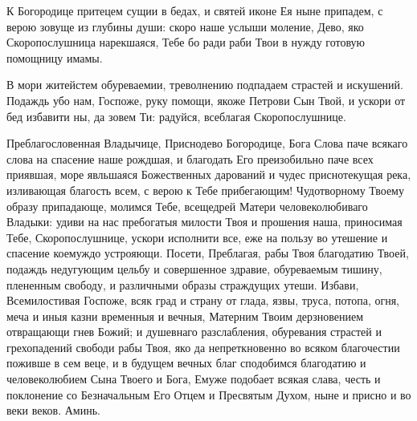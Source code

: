 \begin{mymulticols}


К Богородице притецем сущии в бедах, и святей иконе Ея ныне припадем, с верою зовуще из глубины души: скоро наше услыши моление, Дево, яко Скоропослушница нарекшаяся, Тебе бо ради раби Твои в нужду готовую помощницу имамы.


В мори житейстем обуреваемии, треволнению подпадаем страстей и искушений. Подаждь убо нам, Госпоже, руку помощи, якоже Петрови Сын Твой, и ускори от бед избавити ны, да зовем Ти: радуйся, всеблагая Скоропослушнице.


Преблагословенная Владычице, Приснодево Богородице, Бога Слова паче всякаго слова на спасение наше рождшая, и благодать Его преизобильно паче всех приявшая, море явльшаяся Божественных дарований и чудес приснотекущая река, изливающая благость всем, с верою к Тебе прибегающим! Чудотворному Твоему образу припадающе, молимся Тебе, всещедрей Матери человеколюбиваго Владыки: удиви на нас пребогатыя милости Твоя и прошения наша, приносимая Тебе, Скоропослушнице, ускори исполнити все, еже на пользу во утешение и спасение коемуждо устрояющи. Посети, Преблагая, рабы Твоя благодатию Твоей, подаждь недугующим цельбу и совершенное здравие, обуреваемым тишину, плененным свободу, и различными образы страждущих утеши. Избави, Всемилостивая Госпоже, всяк град и страну от глада, язвы, труса, потопа, огня, меча и иныя казни временныя и вечныя, Матерним Твоим дерзновением отвращающи гнев Божий; и душевнаго разслабления, обуревания страстей и грехопадений свободи рабы Твоя, яко да непреткновенно во всяком благочестии поживше в сем веце, и в будущем вечных благ сподобимся благодатию и человеколюбием Сына Твоего и Бога, Емуже подобает всякая слава, честь и поклонение со Безначальным Его Отцем и Пресвятым Духом, ныне и присно и во веки веков. Аминь.

\end{mymulticols}

\mychapterending

